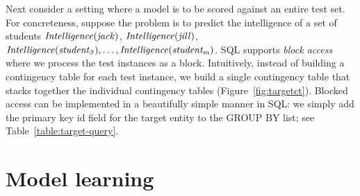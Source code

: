 %
%
%

%
Next consider a setting where a model is to be scored against an entire test set. 
For concreteness, suppose the problem is to predict the intelligence of a set of students
 $\it{Intelligence}(jack)$, $\it{Intelligence}(jill)$,
 $\it{Intelligence}(student_{3}),\ldots, \it{Intelligence}(student_{m})$.
 SQL supports {\em block access} where we process the test instances as a block. Intuitively, instead of building a contingency table for each test instance, we build a single contingency table that stacks together the individual contingency tables (Figure~\ref{fig:targetct}). Blocked access can be implemented in a beautifully simple manner in SQL: we simply add the primary key id field for the target entity to the GROUP BY list; see Table~\ref{table:target-query}. 
\section{Model learning}

